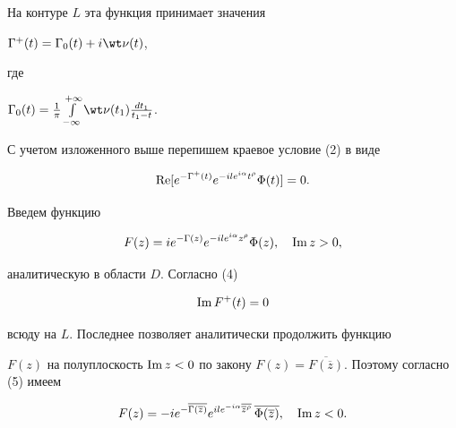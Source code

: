 На контуре $ L $ эта функция принимает значения


$\Gamma^{+}(t) = \Gamma_{0}(t) + i\wt\nu (t)$,


где


$\Gamma_{0} (t) =


\frac{1}{\pi}\int\limits_{-\infty}^{+\infty}\wt \nu (t_1)


\frac{dt_1}{t_1 - t}$.





С учетом изложенного выше перепишем краевое условие (2) в виде


\begin{equation}


\re[e^{-\Gamma^{+}(t)}e^{-ile^{i\alpha}t^{\rho}}\Phi (t)]=0.


\end{equation}





Введем функцию


\begin{equation}


F(z) = ie^{-\Gamma (z)}e^{-ile^{i\alpha}z^{\rho}}\Phi(z),\quad


\im z > 0,


\end{equation}


аналитическую в области $D$. Согласно (4)


\begin{equation}


\im F^{+}(t) = 0


\end{equation}


всюду на $L.$ Последнее позволяет аналитически продолжить функцию


$F(z)$ на полуплоскость $\im z < 0$ по закону $F(z) =


\overline{F(\overline z)}.$ Поэтому согласно (5) имеем


\begin{equation}


F(z) = - ie^{-\overline{\Gamma (\overline z)}}e^{ile^{-


i\alpha}\overline{\overline{z}^{\rho}}}\,\overline{\Phi(\overline z)},


\quad\im z < 0.


\end{equation}





